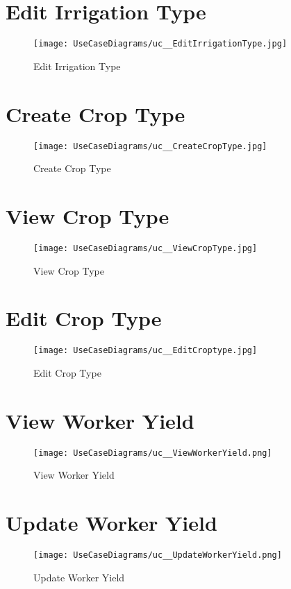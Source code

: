 \documentclass[11pt,fleqn]{book} %
\begin{document}
	\section{Edit Irrigation Type}
	\begin{figure}
		\texttt{[image: UseCaseDiagrams/uc\_\_EditIrrigationType.jpg]}
		\caption{Edit Irrigation Type}
	\end{figure}
	
	\section{Create Crop Type}
	\begin{figure}
		\texttt{[image: UseCaseDiagrams/uc\_\_CreateCropType.jpg]}
		\caption{Create Crop Type}
	\end{figure}
	
	\section{View Crop Type}
	\begin{figure}
		\texttt{[image: UseCaseDiagrams/uc\_\_ViewCropType.jpg]}
		\caption{View Crop Type}
	\end{figure}
	
	\section{Edit Crop Type}
	\begin{figure}
		\texttt{[image: UseCaseDiagrams/uc\_\_EditCroptype.jpg]}
		\caption{Edit Crop Type}
	\end{figure}
	
	\section{View Worker Yield}
	\begin{figure}
		\texttt{[image: UseCaseDiagrams/uc\_\_ViewWorkerYield.png]}
		\caption{View Worker Yield}
	\end{figure}
	
	\section{Update Worker Yield}
	\begin{figure}
		\texttt{[image: UseCaseDiagrams/uc\_\_UpdateWorkerYield.png]}
		\caption{Update Worker Yield}
	\end{figure}
	
\end{document}
